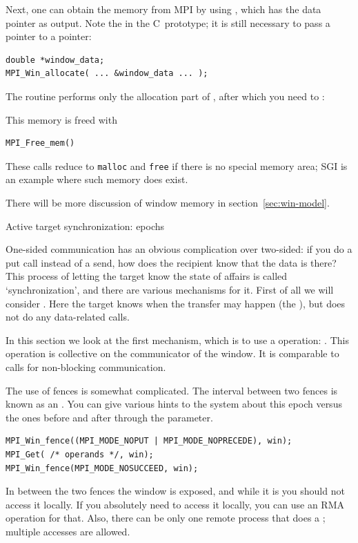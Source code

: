 Next, one can obtain the memory from MPI by using
,
which has the data pointer as output. Note the  in the
C~prototype; it is still necessary to pass a pointer to a pointer:
\lstset{style=reviewcode,language=C}
\begin{lstlisting}
double *window_data;
MPI_Win_allocate( ... &window_data ... );
\end{lstlisting}
The routine  performs only the allocation
part of , after which you need to
:

This memory is freed with
\begin{lstlisting}
MPI_Free_mem()
\end{lstlisting}
These calls reduce to \lstinline{malloc} and \lstinline{free} if there is no special
memory area; SGI is an example where such memory does exist.

There will be more discussion of window memory in section~\ref{sec:win-model}.


 {Active target synchronization: epochs}
\label{sec:fence}

One-sided communication has an obvious complication over two-sided: if
you do a put call instead of a send, how does the recipient know that
the data is there? This process of letting the target know the state
of affairs is called `synchronization', and there are various
mechanisms for it. First of all we will consider . Here the target knows when the transfer
may happen (the ), but does not do
any data-related calls.

In this section we look at the first mechanism,
which is to use a  operation: .
This operation is collective on the communicator of the window.
It is comparable to  calls for non-blocking communication.

The use of fences is somewhat complicated. The interval between two fences
is known as an .
You can give various hints to the system about this epoch versus the ones
before and after through the  parameter.
\begin{lstlisting}
MPI_Win_fence((MPI_MODE_NOPUT | MPI_MODE_NOPRECEDE), win);
MPI_Get( /* operands */, win);
MPI_Win_fence(MPI_MODE_NOSUCCEED, win);
\end{lstlisting}
In between the two fences the window is exposed, and while it is you
should not access it locally. If you absolutely need to access it
locally, you can use an \ac{RMA} operation for that. Also, there can be only one
remote process that does a ; multiple  accesses are allowed.


